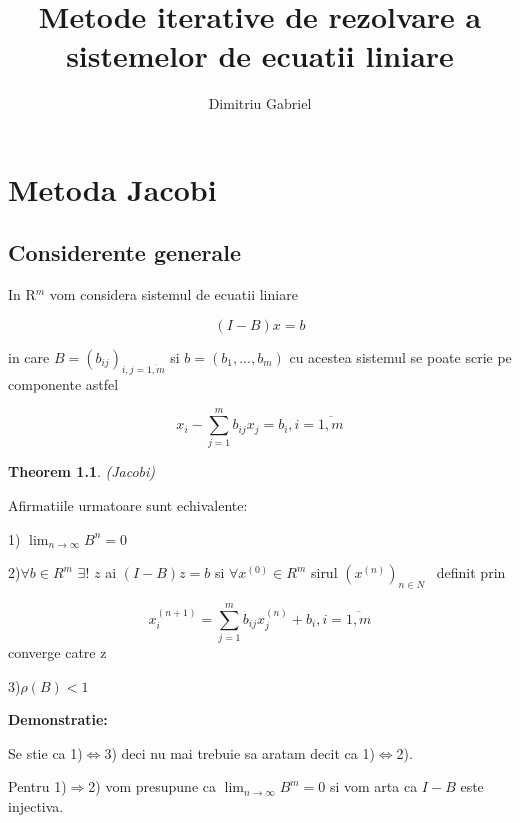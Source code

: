 \documentclass[a4paper,twoside]{book}
\newtheorem{theorem}{Theorem}
\begin{document}
\title{Metode iterative de rezolvare a sistemelor de ecuatii liniare}
\author{Dimitriu Gabriel}
\maketitle
\tableofcontents

\chapter{Metoda Jacobi}

\section{Considerente generale}

In R$^{m}$ vom considera sistemul de ecuatii liniare

\begin{equation}
(I-B)x=b  \label{1}
\end{equation}

in care $B=(b_{ij})_{i,j=\overline{1,m}}$ si $b=(b_{1},...,b_{m})$ cu
acestea sistemul se poate scrie pe componente astfel

\begin{equation}
x_{i}-\sum_{j=1}^{m}b_{ij}x_{j}=b_{i},i=\overline{1,m}  \label{1prim}
\end{equation}

\begin{theorem}
(Jacobi)\label{Jacobi}
\end{theorem}

Afirmatiile urmatoare sunt echivalente:

1) $\lim_{n\rightarrow \infty }B^{n}=0$

2)$\forall b\in R^{m}$ $\exists !$ $z$ ai $(I-B)z=b$ si $\forall x^{(0)}\in
R^{m}$ sirul $(x^{(n)})_{n\in N}$ \ definit prin

\begin{equation}
x_{i}^{(n+1)}=\sum_{j=1}^{m}b_{ij}x_{j}^{(n)}+b_{i},i=\overline{1,m}
\label{2}
\end{equation}%
converge catre z

3)$\rho (B)<1$

\textbf{Demonstratie:}

Se stie ca 1)$\Leftrightarrow $3) deci nu mai trebuie sa aratam decit ca 1)$%
\Leftrightarrow $2).

Pentru 1)$\Rightarrow $2) vom presupune ca $\lim_{n\rightarrow \infty
}B^{m}=0$ si vom arta ca $I-B$ este injectiva.
\end{document}
